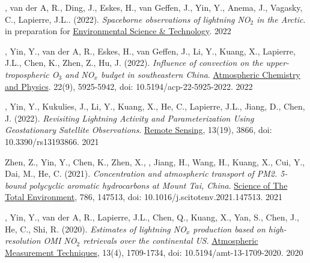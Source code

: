 

\begin{cvpublications}

\publication
{, van der A, R., Ding, J., Eskes, H., van Geffen, J.,
Yin, Y., Anema, J., Vagasky, C., Lapierre, J.L.. (2022).
\emph{Spaceborne observations of lightning NO$_2$ in the Arctic}.
in preparation for \underline{Environmental Science \& Technology}.} %
{2022} %

\publication
{, Yin, Y., van der A, R., Eskes, H., van Geffen, J.,
Li, Y., Kuang, X., Lapierre, J.L., Chen, K., Zhen, Z., Hu, J. (2022).
\emph{Influence of convection on the upper-tropospheric O$_3$ and NO$_x$ budget in southeastern China}.
\underline{Atmospheric Chemistry and Physics}.
22(9), 5925-5942, doi: 10.5194/acp-22-5925-2022.} %
{2022} %

\publication
{, Yin, Y., Kukulies, J., Li, Y., Kuang, X.,
He, C., Lapierre, J.L., Jiang, D., Chen, J. (2022).
\emph{Revisiting Lightning Activity and Parameterization Using
Geostationary Satellite Observations}.
\underline{Remote Sensing}, 13(19), 3866,
doi: 10.3390/rs13193866.} %
{2021} %

\publication
{Zhen, Z., Yin, Y., Chen, K., Zhen, X., ,
Jiang, H., Wang, H., Kuang, X., Cui, Y., Dai, M., He, C. (2021).
\emph{Concentration and atmospheric transport of PM2. 5-bound polycyclic aromatic hydrocarbons at Mount Tai, China}.
\underline{Science of The Total Environment}, 786, 147513,
doi: 10.1016/j.scitotenv.2021.147513.} %
{2021} %

\publication
{, Yin, Y., van der A, R., Lapierre, J.L.,
Chen, Q., Kuang, X., Yan, S., Chen, J., He, C., Shi, R. (2020).
\emph{Estimates of lightning NO$_x$ production based on high-resolution OMI NO$_2$ retrievals over the continental US}.
\underline{Atmospheric Measurement Techniques}, 13(4), 1709-1734,
doi: 10.5194/amt-13-1709-2020.} %
{2020} %


\end{cvpublications}
